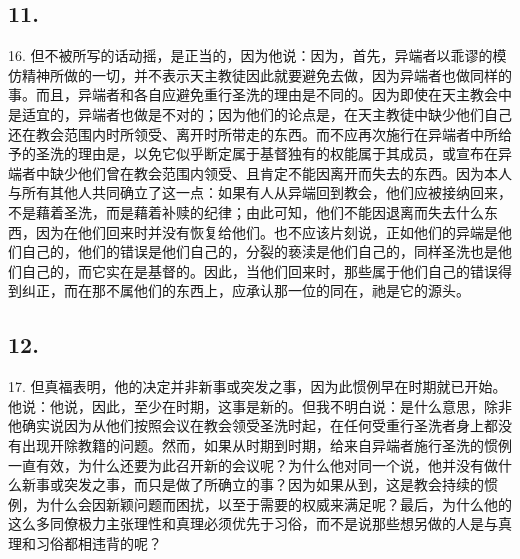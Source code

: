 
\subsection{11.}

16. 但不被所写的话动摇，是正当的，因为他说：因为，首先，异端者以乖谬的模仿精神所做的一切，并不表示天主教徒因此就要避免去做，因为异端者也做同样的事。而且，异端者和各自应避免重行圣洗的理由是不同的。因为即使在天主教会中是适宜的，异端者也做是不对的；因为他们的论点是，在天主教徒中缺少他们自己还在教会范围内时所领受、离开时所带走的东西。而不应再次施行在异端者中所给予的圣洗的理由是，以免它似乎断定属于基督独有的权能属于其成员，或宣布在异端者中缺少他们曾在教会范围内领受、且肯定不能因离开而失去的东西。因为本人与所有其他人共同确立了这一点：如果有人从异端回到教会，他们应被接纳回来，不是藉着圣洗，而是藉着补赎的纪律；由此可知，他们不能因退离而失去什么东西，因为在他们回来时并没有恢复给他们。也不应该片刻说，正如他们的异端是他们自己的，他们的错误是他们自己的，分裂的亵渎是他们自己的，同样圣洗也是他们自己的，而它实在是基督的。因此，当他们回来时，那些属于他们自己的错误得到纠正，而在那不属他们的东西上，应承认那一位的同在，祂是它的源头。\par


\subsection{12.}

17. 但真福表明，他的决定并非新事或突发之事，因为此惯例早在时期就已开始。他说：他说，因此，至少在时期，这事是新的。但我不明白说：是什么意思，除非他确实说因为从他们按照会议在教会领受圣洗时起，在任何受重行圣洗者身上都没有出现开除教籍的问题。然而，如果从时期到时期，给来自异端者施行圣洗的惯例一直有效，为什么还要为此召开新的会议呢？为什么他对同一个说，他并没有做什么新事或突发之事，而只是做了所确立的事？因为如果从到，这是教会持续的惯例，为什么会因新颖问题而困扰，以至于需要的权威来满足呢？最后，为什么他的这么多同僚极力主张理性和真理必须优先于习俗，而不是说那些想另做的人是与真理和习俗都相违背的呢？\par

